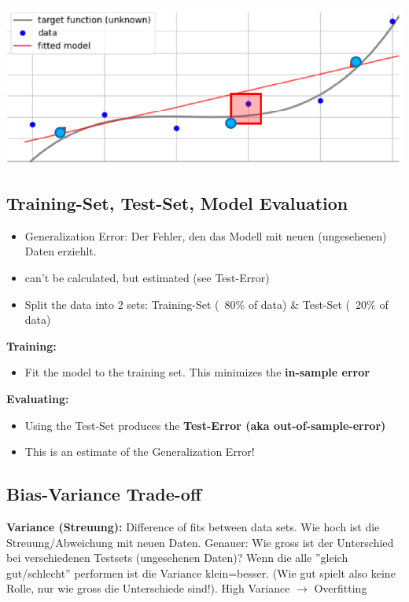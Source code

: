 \includegraphics[width=0.9\linewidth]{./img/underfitting.png}

\subsection{Training-Set, Test-Set, Model Evaluation}
\begin{itemize}
    \item Generalization Error: Der Fehler, den das Modell mit neuen (ungesehenen) Daten erziehlt.
    \item can't be calculated, but estimated (see Test-Error)
    \item Split the data into 2 sets: Training-Set (~80\% of data) \& Test-Set (~20\% of data)
\end{itemize}
\textbf{Training:} 
\begin{itemize}
    \item Fit the model to the training set. This minimizes the \textbf{in-sample error}
\end{itemize} 
\textbf{Evaluating:}
\begin{itemize}
    \item Using the Test-Set produces the \textbf{Test-Error (aka out-of-sample-error)}
    \item This is an estimate of the Generalization Error!
\end{itemize}

\subsection{Bias-Variance Trade-off}
\textbf{Variance (Streuung):} Difference of fits between data sets. Wie hoch ist die Streuung/Abweichung mit neuen Daten. Genauer: Wie gross ist der Unterschied bei verschiedenen Testsets (ungesehenen Daten)? Wenn die alle ''gleich gut/schlecht'' performen ist die Variance klein=besser. (Wie gut spielt also keine Rolle, nur wie gross die Unterschiede sind!). High Variance $\rightarrow$ Overfitting  

